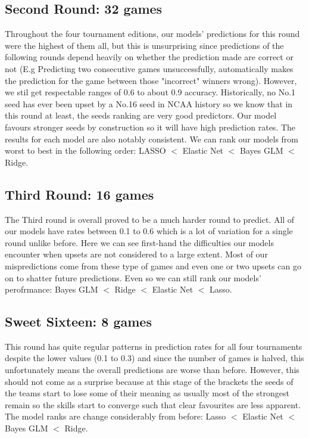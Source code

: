 \documentclass{article} %
\begin{document}
\subsection{Second Round: 32 games}

Throughout the four tournament editions, our models' predictions for this round were the highest of them all, but this is unsurprising since predictions of the following rounds depend heavily on whether the prediction made are correct or not (E.g Predicting two consecutive games unsuccessfully, automatically makes the prediction for the game between those "incorrect" winners wrong). However, we stil get respectable ranges of 0.6 to about 0.9 accuracy. Historically, no No.1 seed has ever been upset by a No.16 seed in NCAA history so we know that in this round at least, the seeds ranking are very good predictors. Our model favours stronger seeds by construction so it will have high prediction rates. The results for each model are also notably consistent. We can rank our models from worst to best in the following order: LASSO $<$ Elastic Net $<$ Bayes GLM $<$ Ridge.

\subsection{Third Round: 16 games}

The Third round is overall proved to be a much harder round to predict. All of our models have rates between 0.1 to 0.6 which is a lot of variation for a single round unlike before. Here we can see first-hand the difficulties our models encounter when upsets are not considered to a large extent. Most of our mispredictions come from these type of games and even one or two upsets can go on to shatter future predictions. Even so we can still rank our models' perofrmance: Bayes GLM $<$ Ridge $<$ Elastic Net $<$ Lasso.

\subsection{Sweet Sixteen: 8 games}

This round has quite regular patterns in prediction rates for all four tournaments despite the lower values (0.1 to 0.3) and since the number of games is halved, this unfortunately means the overall predictions are worse than before. However, this should not come as a surprise because at this stage of the brackets the seeds of the teams start to lose some of their meaning as usually most of the strongest remain so the skills start to converge such that clear favourites are less apparent. The model ranks are change considerably from before: Lasso  $<$ Elastic Net $<$ Bayes GLM $<$ Ridge.   
\end{document}
